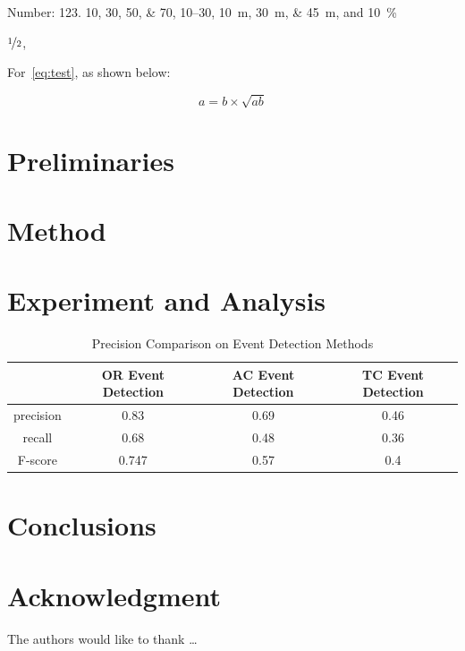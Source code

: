 \documentclass{amsart}
\theoremstyle{definition}
\theoremstyle{remark}
\numberwithin{equation}{section}
\begin{document}
Number:
\num{123}.
\numlist{10;30;50;70},
\numrange{10}{30},
\SIlist{10;30;45}{\metre},
and
\SI{10}{\percent}

$\nicefrac[]{1}{2}$,


For~\cref{eq:test},
as shown below:

\begin{equation}\label{eq:test}
a = b \times \sqrt{ab}
\end{equation}

\section{Preliminaries} \label{sec-preliminaries}

\lipsum


\section{Method} \label{sec-method}

\section{Experiment and Analysis} \label{sec-experiment}

\begin{table}  \centering
  \caption{Precision Comparison on Event Detection Methods}
  \label{tbl:overall-experiments}
  \begin{tabular}{cccc}
\toprule
    & OR Event Detection & AC Event Detection & TC Event Detection \\
\midrule
    precision & 0.83 & 0.69 & 0.46 \\
    recall & 0.68 & 0.48 & 0.36 \\
    F-score & 0.747 & 0.57 & 0.4 \\
\bottomrule
\end{tabular}
\end{table}

\section{Conclusions} \label{sec-conclusions}

\section*{Acknowledgment}

The authors would like to thank \ldots

\newpage
%


\end{document}
